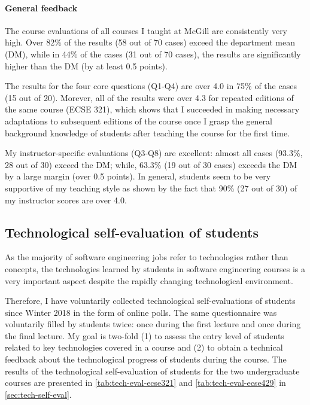 \paragraph{General feedback}
The course evaluations of all courses I taught at McGill are consistently very high. Over 82\% of the results (58 out of 70 cases) exceed the department mean (DM), while in 44\% of the cases (31 out of 70 cases), the results are significantly higher than the DM (by at least 0.5 points). 

The results for the four core questions (Q1-Q4) are over 4.0 in 75\% of the cases (15 out of 20). Morever, all of the results 
were over 4.3 for repeated editions of the same course (ECSE 321), which shows that I succeeded in making necessary 
adaptations to subsequent editions of the course once I grasp the general background knowledge of students after teaching 
the course for the first time. 

My instructor-specific evaluations (Q3-Q8) are excellent: almost all cases (93.3\%, 28 out of 30) exceed the DM; while, 
63.3\% (19 out of 30 cases) exceeds the DM by a large margin (over 0.5 points).  In general, students seem to be very 
supportive of my teaching style as shown by the fact that 90\% (27 out of 30) of my instructor scores are over 4.0.

\subsection{Technological self-evaluation of students}
As the majority of software engineering jobs refer to technologies rather than concepts, the technologies learned by students in software engineering courses is a very important aspect despite the rapidly changing technological environment.

Therefore, I have voluntarily collected technological self-evaluations of students since Winter 2018 in the form of online polls. The same questionnaire was voluntarily filled by students twice: once during the first lecture and once during the final lecture. My goal is two-fold (1) to assess the entry level of students related to key technologies covered in a course and (2) to obtain a technical feedback about the technological progress of students during the course. 
The results of the technological self-evaluation of students for the two undergraduate courses are presented in \autoref{tab:tech-eval-ecse321} and \autoref{tab:tech-eval-ecse429} in \autoref{sec:tech-self-eval}.

